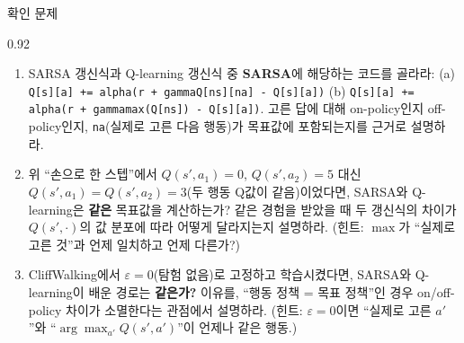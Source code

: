 \begin{frame}{확인 문제}
\begin{center}\begin{varwidth}{0.92\textwidth}
  \small
  \begin{enumerate}
    \item SARSA 갱신식과 Q-learning 갱신식 중 \textbf{SARSA}에 해당하는
      코드를 골라라:
      (a) \texttt{Q[s][a] += alpha(r + gammaQ[ns][na] - Q[s][a])}
      (b) \texttt{Q[s][a] += alpha(r + gammamax(Q[ns]) - Q[s][a])}.
      고른 답에 대해 on-policy인지 off-policy인지, \texttt{na}(실제로
      고른 다음 행동)가 목표값에 포함되는지를 근거로 설명하라.
    \item 위 ``손으로 한 스텝''에서 $Q(s',a_1)=0$, $Q(s',a_2)=5$ 대신
      \textbf{$Q(s',a_1)=Q(s',a_2)=3$}(두 행동 Q값이 같음)이었다면,
      SARSA와 Q-learning은 \textbf{같은} 목표값을 계산하는가?
      같은 경험을 받았을 때 두 갱신식의 차이가 $Q(s',\cdot)$의 값
      분포에 따라 어떻게 달라지는지 설명하라.
      (힌트: $\max$가 ``실제로 고른 것''과 언제 일치하고 언제 다른가?)
    \item CliffWalking에서 $\varepsilon = 0$(탐험 없음)로 고정하고
      학습시켰다면, SARSA와 Q-learning이 배운 경로는 \textbf{같은가?}
      이유를, ``행동 정책 = 목표 정책''인 경우 on/off-policy 차이가
      소멸한다는 관점에서 설명하라.
      (힌트: $\varepsilon=0$이면 ``실제로 고른 $a'$''와
      ``$\arg\max_{a'}Q(s',a')$''이 언제나 같은 행동.)
  \end{enumerate}
\end{varwidth}\end{center}
\end{frame}
